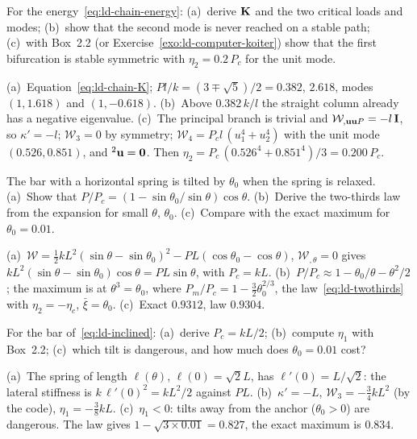 \label{exo:ld-chain}
%
For the energy~\eqref{eq:ld-chain-energy}:
(a)~derive $\mathbf{K}$ and the two critical loads and modes;
(b)~show that the second mode is never reached on a stable path;
(c)~with Box~2.2 (or Exercise~\ref{exo:ld-computer-koiter}) show that the first
bifurcation is stable symmetric with $\eta_2 = 0.2\,P_c$ for the unit mode.
\begin{solution}
(a)~Equation~\eqref{eq:ld-chain-K}; $Pl/k = (3 \mp \sqrt5)/2 = 0.382$, $2.618$, modes
$(1, 1.618)$ and $(1, -0.618)$. (b)~Above $0.382\,k/l$ the straight column already has a
negative eigenvalue. (c)~The principal branch is trivial and $\mathcal{W}_{,\mathbf{u}\mathbf{u}P} = -l\,\mathbf{I}$,
so $\kappa' = -l$; $\mathcal{W}_3 = 0$ by symmetry; $\mathcal{W}_4 = P_c l\,(u_1^4 + u_2^4)$
with the unit mode $(0.526, 0.851)$, and ${}^2\mathbf{u} = \mathbf{0}$. Then
$\eta_2 = P_c\,(0.526^4 + 0.851^4)/3 = 0.200\,P_c$.
\end{solution}

\label{exo:ld-lateral}
%
The bar with a horizontal spring is tilted by $\theta_0$ when the spring is relaxed.
(a)~Show that $P/P_c = (1 - \sin\theta_0/\sin\theta)\cos\theta$.
(b)~Derive the two-thirds law from the expansion for small $\theta$, $\theta_0$.
(c)~Compare with the exact maximum for $\theta_0 = 0.01$.
\begin{solution}
(a)~$\mathcal{W} = \tfrac12 kL^2(\sin\theta - \sin\theta_0)^2 - PL(\cos\theta_0 - \cos\theta)$,
$\mathcal{W}_{,\theta} = 0$ gives $kL^2(\sin\theta - \sin\theta_0)\cos\theta = PL\sin\theta$, with $P_c = kL$.
(b)~$P/P_c \approx 1 - \theta_0/\theta - \theta^2/2$; the maximum is at $\theta^3 = \theta_0$,
where $P_m/P_c = 1 - \tfrac32\theta_0^{2/3}$, the law~\eqref{eq:ld-twothirds} with
$\eta_2 = -\eta_c$, $\bar\xi = \theta_0$. (c)~Exact $0.9312$, law $0.9304$.
\end{solution}

\label{exo:ld-inclined}
%
For the bar of~\eqref{eq:ld-inclined}: (a)~derive $P_c = kL/2$; (b)~compute $\eta_1$
with Box~2.2; (c)~which tilt is dangerous, and how much does $\theta_0 = 0.01$ cost?
\begin{solution}
(a)~The spring of length $\ell(\theta)$, $\ell(0) = \sqrt2 L$, has
$\ell'(0) = L/\sqrt2$: the lateral stiffness is $k\,\ell'(0)^2 = kL^2/2$ against $PL$.
(b)~$\kappa' = -L$, $\mathcal{W}_3 = -\tfrac34kL^2$ (by the code), $\eta_1 = -\tfrac38kL$.
(c)~$\eta_1 < 0$: tilts away from the anchor ($\theta_0 > 0$) are dangerous. The law gives
$1 - \sqrt{3\times0.01} = 0.827$, the exact maximum is $0.834$.
\end{solution}

